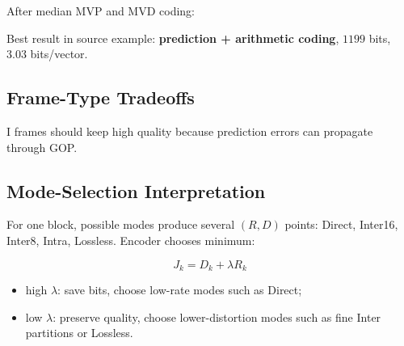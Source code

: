 After median MVP and MVD coding:

\begin{center}
\end{center}

Best result in source example: \textbf{prediction + arithmetic coding}, $1199$ bits, $3.03$ bits/vector.

\subsection{Frame-Type Tradeoffs}

\begin{center}
\end{center}

I frames should keep high quality because prediction errors can propagate through GOP.

\subsection{Mode-Selection Interpretation}

For one block, possible modes produce several $(R,D)$ points: Direct, Inter16, Inter8, Intra, Lossless. Encoder chooses minimum:

\[
J_k=D_k+\lambda R_k
\]

\begin{itemize}
  \item high $\lambda$: save bits, choose low-rate modes such as Direct;
  \item low $\lambda$: preserve quality, choose lower-distortion modes such as fine Inter partitions or Lossless.
\end{itemize}

